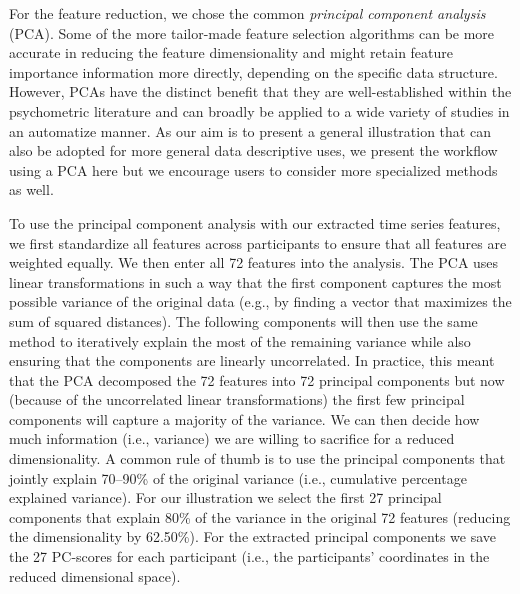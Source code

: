 For the feature reduction, we chose the common
\textit{principal component analysis} (PCA). Some of the more
tailor-made feature selection algorithms can be more accurate in
reducing the feature dimensionality and might retain feature importance
information more directly, depending on the specific data structure.
However, PCAs have the distinct benefit that they are well-established
within the psychometric literature and can broadly be applied to a wide
variety of studies in an automatize manner. As our aim is to present a
general illustration that can also be adopted for more general data
descriptive uses, we present the workflow using a PCA here but we
encourage users to consider more specialized methods as well.

To use the principal component analysis with our extracted time series
features, we first standardize all features across participants to
ensure that all features are weighted equally. We then enter all 72
features into the analysis. The PCA uses linear transformations in such
a way that the first component captures the most possible variance of
the original data (e.g., by finding a vector that maximizes the sum of
squared distances). The following components will then use the same
method to iteratively explain the most of the remaining variance while
also ensuring that the components are linearly uncorrelated. In
practice, this meant that the PCA decomposed the 72 features into 72
principal components but now (because of the uncorrelated linear
transformations) the first few principal components will capture a
majority of the variance. We can then decide how much information (i.e.,
variance) we are willing to sacrifice for a reduced dimensionality. A
common rule of thumb is to use the principal components that jointly
explain 70--90\% of the original variance (i.e., cumulative percentage
explained variance). For our illustration we select the first 27
principal components that explain 80\% of the variance in the original
72 features (reducing the dimensionality by 62.50\%). For the extracted
principal components we save the 27 PC-scores for each participant
(i.e., the participants' coordinates in the reduced dimensional space).

